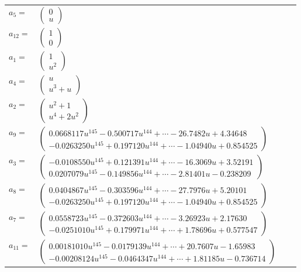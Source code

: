 \documentclass[1p]{elsarticle_modified}
\theoremstyle{definition}
\begin{document}
\begin{tabular}{m{7pt} m{180pt} m{7pt} m{180pt} }
\flushright $a_{5}=$&$\begin{pmatrix}0\\u\end{pmatrix}$ \\
\flushright $a_{12}=$&$\begin{pmatrix}1\\0\end{pmatrix}$ \\
\flushright $a_{1}=$&$\begin{pmatrix}1\\u^2\end{pmatrix}$ \\
\flushright $a_{4}=$&$\begin{pmatrix}u\\u^3+u\end{pmatrix}$ \\
\flushright $a_{2}=$&$\begin{pmatrix}u^2+1\\u^4+2 u^2\end{pmatrix}$ \\
\flushright $a_{9}=$&$\begin{pmatrix}0.0668117 u^{145}-0.500717 u^{144}+\cdots-26.7482 u+4.34648\\-0.0263250 u^{145}+0.197120 u^{144}+\cdots-1.04940 u+0.854525\end{pmatrix}$ \\
\flushright $a_{3}=$&$\begin{pmatrix}-0.0108550 u^{145}+0.121391 u^{144}+\cdots-16.3069 u+3.52191\\0.0207079 u^{145}-0.149856 u^{144}+\cdots-2.81401 u-0.238209\end{pmatrix}$ \\
\flushright $a_{8}=$&$\begin{pmatrix}0.0404867 u^{145}-0.303596 u^{144}+\cdots-27.7976 u+5.20101\\-0.0263250 u^{145}+0.197120 u^{144}+\cdots-1.04940 u+0.854525\end{pmatrix}$ \\
\flushright $a_{7}=$&$\begin{pmatrix}0.0558723 u^{145}-0.372603 u^{144}+\cdots-3.26923 u+2.17630\\-0.0251010 u^{145}+0.179971 u^{144}+\cdots+1.78696 u+0.577547\end{pmatrix}$ \\
\flushright $a_{11}=$&$\begin{pmatrix}0.00181010 u^{145}-0.0179139 u^{144}+\cdots+20.7607 u-1.65983\\-0.00208124 u^{145}-0.0464347 u^{144}+\cdots+1.81185 u-0.736714\end{pmatrix}$ \\

\end{tabular}
\end{document}
